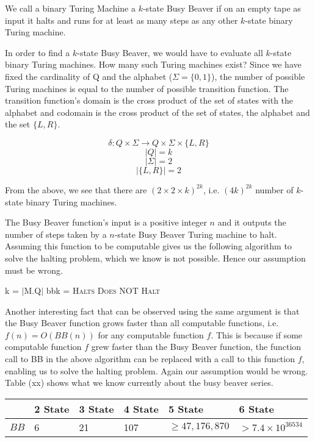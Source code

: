 \documentclass[a4paper]{article}
\begin{document}
We call a binary Turing Machine a \(k\)-state Busy Beaver if on an empty tape as
input it halts and runs for at least as many steps as any other \(k\)-state
binary Turing machine.

In order to find a \(k\)-state Busy Beaver, we would have to evaluate all
\(k\)-state binary Turing machines. How many such Turing machines exist?
Since we have fixed the cardinality of Q and the alphabet
(\(\Sigma = \{0, 1\}\)), the number of possible Turing machines is equal to
the number of possible transition function. The transition function's domain is
the cross product of the set of states with the alphabet and codomain is the
cross product of the set of states, the alphabet and the set \(\{L, R\}\).

\[\delta: Q \times \Sigma \rightarrow Q \times \Sigma \times \{L, R\}\]
\[|Q| = k\]
\[|\Sigma| = 2\]
\[|\{L, R\}| = 2\]

From the above, we see that there are \({(2 \times 2 \times k)}^{2k}\), i.e.
\({(4k)}^{2k}\) number of \(k\)-state binary Turing machines.

The Busy Beaver function's input is a positive integer \(n\) and it outputs the
number of steps taken by a \(n\)-state Busy Beaver Turing machine to halt.
Assuming this function to be computable gives us the following algorithm to
solve the halting problem, which we know is not possible. Hence our assumption
must be wrong.

\begin{algorithmic}
  \State k = \(|\)M.Q\(|\) 
  \State bbk =  
  \Return \textsc{Halts} 
  \Else
  \space \Return \textsc{Does NOT Halt}
\EndIf
\EndFunction
\end{algorithmic}

Another interesting fact that can be observed using the same argument is that
the Busy Beaver function grows faster than all computable functions,
i.e. \(f(n) = O(BB(n))\) for any computable function \(f\). This is because if
some computable function \(f\) grew faster than the Busy Beaver function, the
function call to BB in the above algorithm can be replaced with a call to this
function \(f\), enabling us to solve the halting problem. Again our assumption
would be wrong. Table (xx) shows what we know currently about the
busy beaver series.

\begin{center}
  \begin{tabular}{ |l|l|l|l|l|l| }
    \hline
    & 2 State & 3 State & 4 State & 5 State & 6 State \\ \hline

    \(BB\) & 6 & 21 & 107 & \(\geq 47,176,870\) & \(> 7.4 \times 10^{36534}\)
    \\ \hline
  \end{tabular}
\end{center}
\end{document}
